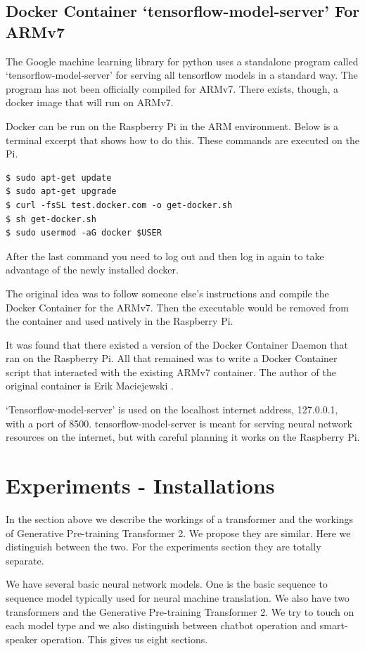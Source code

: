 \subsection{Docker Container `tensorflow-model-server' For ARMv7}
The Google machine learning library for python uses a standalone program called `tensorflow-model-server' for serving all tensorflow models in a standard way. The program has not been officially compiled for ARMv7. There exists, though, a docker image that will run on ARMv7.

Docker can be run on the Raspberry Pi in the ARM environment. Below is a terminal excerpt that shows how to do this. These commands are executed on the Pi.

\begin{verbatim}
$ sudo apt-get update
$ sudo apt-get upgrade
$ curl -fsSL test.docker.com -o get-docker.sh 
$ sh get-docker.sh
$ sudo usermod -aG docker $USER
\end{verbatim}

After the last command you need to log out and then log in again to take advantage of the newly installed docker.

The original idea was to follow someone else's instructions and compile the Docker Container for the ARMv7. Then the executable would be removed from the container and used natively in the Raspberry Pi.

It was found that there existed a version of the Docker Container Daemon that ran on the Raspberry Pi. All that remained was to write a Docker Container script that interacted with the existing ARMv7 container. The author of the original container is Erik Maciejewski \cite{2020Maciejewski}.

`Tensorflow-model-server' is used on the localhost internet address, 127.0.0.1, with a port of 8500. tensorflow-model-server is meant for serving neural network resources on the internet, but with careful planning it works on the Raspberry Pi.

\section{Experiments - Installations}
In the section above we describe the workings of a transformer and the workings of Generative Pre-training Transformer 2. We propose they are similar. Here we distinguish between the two. For the experiments section they are totally separate.

We have several basic neural network models. One is the basic sequence to sequence model typically used for neural machine translation. We also have two transformers and the Generative Pre-training Transformer 2. We try to touch on each model type and we also distinguish between chatbot operation and smart-speaker operation. This gives us eight sections. 

